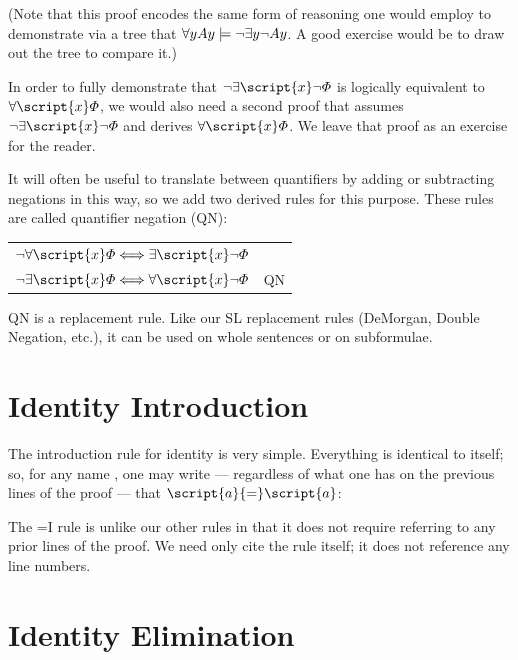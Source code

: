 (Note that this proof encodes the same form of reasoning one would employ to demonstrate via a tree that $\forall y Ay \models \neg \exists y \neg Ay$. A good exercise would be to draw out the tree to compare it.)

In order to fully demonstrate that $\enot\exists \script{x}\enot\metaA{}$ is logically equivalent to $\forall \script{x}\metaA{}$, we would also need a second proof that assumes $\enot\exists \script{x}\enot\metaA{}$ and derives $\forall \script{x}\metaA{}$. We leave that proof as an exercise for the reader.

It will often be useful to translate between quantifiers by adding or subtracting negations in this way, so we add two derived rules for this purpose. These rules are called quantifier negation (QN):
\begin{center}
\begin{tabular}{rl}
$\enot\forall\script{x}\metaA{} \Longleftrightarrow \exists\script{x}\enot\metaA{}$\\
$\enot\exists\script{x}\metaA{} \Longleftrightarrow \forall\script{x}\enot\metaA{}$
& QN
\end{tabular}
\end{center}
QN is a replacement rule. Like our SL replacement rules (DeMorgan, Double Negation, etc.), it can be used on whole sentences or on subformulae.

\section{Identity Introduction}

The introduction rule for identity is very simple. Everything is identical to itself; so, for any name , one may write --- regardless of what one has on the previous lines of the proof --- that $\script{a}{=}\script{a}$:

\begin{ndproof}
	 
\end{ndproof}

The {=}I rule is unlike our other rules in that it does not require referring to any prior lines of the proof. We need only cite the rule itself; it does not reference any line numbers.

\section{Identity Elimination}

